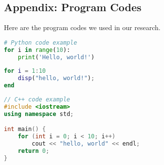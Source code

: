 \documentclass[12pt]{article}  %
\begin{document}
\begin{subappendices}  %

\section{Appendix: Program Codes}
Here are the program codes we used in our research.


\begin{lstlisting}[language=Python, name={test.py}]
# Python code example
for i in range(10):
    print('Hello, world!')
\end{lstlisting}

\begin{lstlisting}[language=MATLAB, name={test.m}]
% MATLAB code example
for i = 1:10
    disp("hello, world!");
end
\end{lstlisting}

\begin{lstlisting}[language=C++, name={test.cpp}]
// C++ code example
#include <iostream>
using namespace std;

int main() {
    for (int i = 0; i < 10; i++)
        cout << "hello, world" << endl;
    return 0;
}
\end{lstlisting}

\end{subappendices}  %
\end{document}
